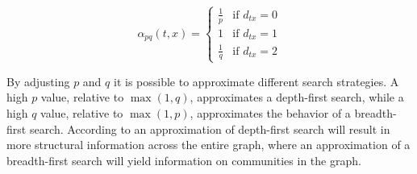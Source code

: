 \begin{equation}
\label{eq:bias}
\alpha_{pq}(t,x)=
\begin{cases}
  \frac{1}{p} & \text{if } d_{tx}=0 \\
  1           & \text{if } d_{tx}=1 \\
  \frac{1}{q} & \text{if } d_{tx}=2
\end{cases}
\end{equation}

By adjusting $p$ and $q$ it is possible to approximate different search strategies. A high $p$ value, relative to $\max(1,q)$, approximates a depth-first search, while a high $q$ value, relative to $\max(1,p)$, approximates the behavior of a breadth-first search. According to \cite{node2vec} an approximation of depth-first search will result in more structural information across the entire graph, where an approximation of a breadth-first search will yield information on communities in the graph.

